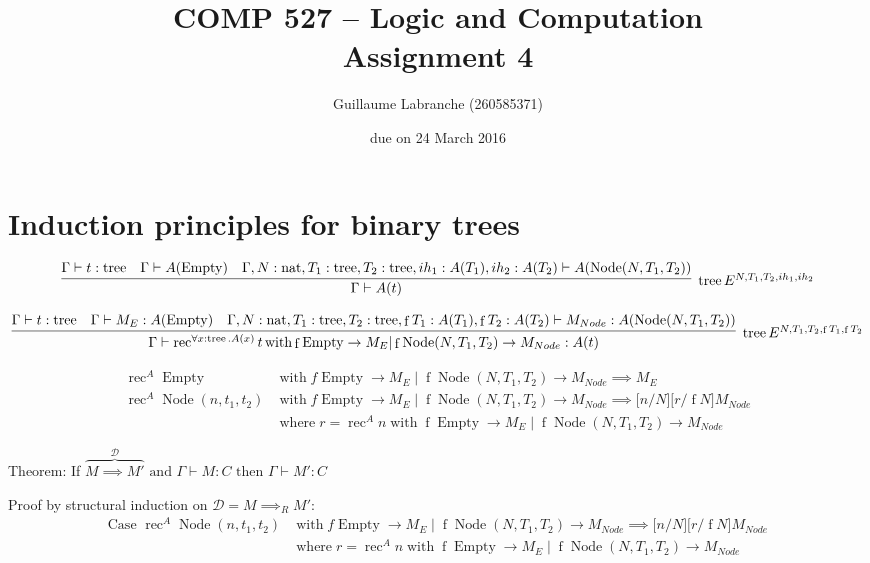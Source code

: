 \documentclass{article}
\author{Guillaume Labranche (260585371)}
\title{COMP 527 -- Logic and Computation\\Assignment 4}
\date{due on 24 March 2016}
\newcommand{\proves}{\vdash}
\newcommand{\GV}{\Gamma \proves}
\DeclareMathOperator{\tree}{tree}
\DeclareMathOperator{\Empty}{Empty}
\DeclareMathOperator{\Node}{Node}
\DeclareMathOperator{\nat}{nat}
\DeclareMathOperator{\f}{f}
\DeclareMathOperator{\rec}{rec}
\DeclareMathOperator{\with}{with}
\DeclareMathOperator{\where}{where}
\begin{document}
\maketitle

\section{Induction principles for binary trees}
\begin{enumerate}
{\small \item \[
\infer[\tree E^{N,T_1,T_2,ih_1,ih_2}]
  {\GV A(t)}
  {\GV t : \tree
   & \GV A(\Empty)
   & \Gamma,N:\nat,T_1:\tree,T_2:\tree,ih_1 : A(T_1), ih_2 : A(T_2) \proves A(\Node(N,T_1,T_2))}
\] }

{\footnotesize \item \[
\infer[\tree E^{N,T_1,T_2,\f T_1,\f T_2}]
  {\GV \rec^{\forall x:\tree.A(x)} t \with \f \Empty \to M_E | \f \Node(N,T_1,T_2) \to M_{Node} : A(t)}
  {\GV t : \tree
   & \GV M_E : A(\Empty)
   & \Gamma,N:\nat,T_1:\tree,T_2:\tree,\f T_1 : A(T_1),\f T_2 : A(T_2) \proves M_{Node} : A(\Node(N,T_1,T_2))}
\]}

\item \begin{align*}
\rec^A \Empty &\with f \Empty \to M_E \mid \f \Node(N,T_1,T_2) \to M_{Node} \implies M_E \\
\rec^A \Node(n,t_1,t_2) &\with f \Empty \to M_E \mid \f \Node(N,T_1,T_2) \to M_{Node} \implies {[}n/N{]}{[}r/\f N{]} M_{Node} \\
&\where r = \rec^A n \with \f \Empty \to M_E \mid \f \Node(N,T_1,T_2) \to M_{Node}
\end{align*}


\item Theorem: If $\overbrace{M \implies M'}^{\mathcal D} \text{ and } \Gamma \vdash M:C \text{ then } \Gamma\vdash M':C$

Proof by structural induction on $\mathcal D = M \implies_R M'$: 
\begin{align*}
\text{Case } \rec^A \Node(n,t_1,t_2) &\with f \Empty \to M_E \mid \f \Node(N,T_1,T_2) \to M_{Node} \implies {[}n/N{]}{[}r/\f N{]} M_{Node} \\
&\where r = \rec^A n \with \f \Empty \to M_E \mid \f \Node(N,T_1,T_2) \to M_{Node}
\end{align*}


\end{enumerate}
\end{document}
